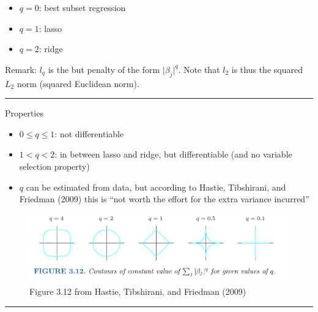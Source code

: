 \documentclass[
  letterpaper,
  DIV=11,
  numbers=noendperiod]{scrartcl}
\providecommand{\tightlist}{%
  \setlength{\itemsep}{0pt}\setlength{\parskip}{0pt}}\usepackage{longtable,booktabs,array}
\begin{document}
\begin{itemize}
\tightlist
\item
  \(q=0\): best subset regression
\item
  \(q=1\): lasso
\item
  \(q=2\): ridge
\end{itemize}

Remark: \(l_q\) is the but penalty of the form
\(\lvert \beta_j\rvert^q\). Note that \(l_2\) is thus the squared
\(L_2\) norm (squared Euclidean norm).

\begin{center}\rule{0.5\linewidth}{0.5pt}\end{center}

Properties

\begin{itemize}
\tightlist
\item
  \(0 \le q \le 1\): not differentiable
\item
  \(1<q<2\): in between lasso and ridge, but differentiable (and no
  variable selection property)
\item
  \(q\) can be estimated from data, but according to Hastie, Tibshirani,
  and Friedman (2009) this is ``not worth the effort for the extra
  variance incurred''
\end{itemize}

\begin{figure}

{\centering \includegraphics[width=1\textwidth,height=\textheight]{./ESLFig312.jpg}

}

\caption{Figure 3.12 from Hastie, Tibshirani, and Friedman (2009)}

\end{figure}

\begin{center}\rule{0.5\linewidth}{0.5pt}\end{center}
\end{document}
